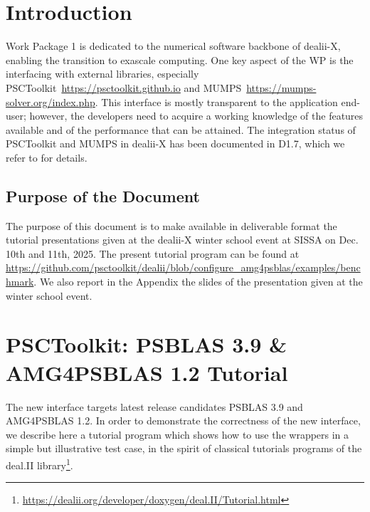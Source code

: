 \documentclass[a4paper,12pt]{article}
\begin{document}
\vspace*{2cm}

\disclaimer

\newpage

\tableofcontents %

\newpage

\section{{Introduction}}

Work Package 1 is dedicated to the numerical software backbone of
dealii-X, enabling the transition to exascale computing. One key
aspect of the WP is the interfacing with external libraries,
especially PSCToolkit~\url{https://psctoolkit.github.io} and MUMPS~\url{https://mumps-solver.org/index.php}.
This interface is mostly transparent to the application end-user;
however, the developers need to acquire a working knowledge of the
features available and of the performance that can be attained. The integration
status of PSCToolkit and MUMPS in dealii-X has been documented in D1.7, which we refer to
for details.

\subsection{{Purpose of the Document}}
The purpose of this document is to make available in deliverable
format the tutorial presentations given at the dealii-X winter school event at
SISSA on Dec. 10th and 11th, 2025. The present tutorial program can be found
at \url{https://github.com/psctoolkit/dealii/blob/configure_amg4psblas/examples/benchmark}. We also report in the Appendix the slides of the presentation given at the winter school event.

\section{PSCToolkit: PSBLAS 3.9 \& AMG4PSBLAS 1.2 Tutorial}


The new interface targets latest release candidates PSBLAS 3.9 and AMG4PSBLAS 1.2. In order
to demonstrate the correctness of the new interface, we describe here a tutorial program which shows
how to use the wrappers in a simple but illustrative test case, in the spirit of classical
tutorials programs of the deal.II library\footnote{\url{https://dealii.org/developer/doxygen/deal.II/Tutorial.html}}.
\end{document}
